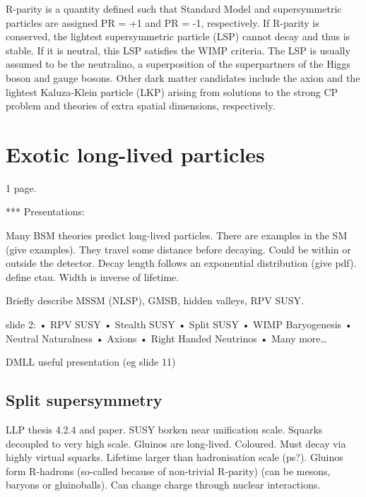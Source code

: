 R-parity is a quantity defined such that Standard Model and supersymmetric 
particles are assigned PR = +1 and PR = -1, respectively. If R-parity is 
conserved, the lightest supersymmetric particle (LSP) cannot decay and thus is 
stable. If it is neutral, this LSP satisfies the WIMP criteria. The LSP is 
usually assumed to be the neutralino, a superposition of the superpartners of 
the Higgs boson and gauge bosons. Other dark matter candidates include the 
axion and the lightest Kaluza-Klein particle (LKP) arising from solutions to 
the strong CP problem and theories of extra spatial dimensions, respectively.

\section{Exotic long-lived particles}
\begin{comment}
More details on LL theories (see LLP thesis, rob slides, my IC/SUSY slides 
etc.), R-hadron, displaced-X searches, GMSB? Note that LLPs exist in SM – call 
them BSMLLPs or LL DM/SUSY signatures? – no, exotic LLPs!
\end{comment}
1 page.

*** Presentations: 


Many BSM theories predict long-lived particles. There are examples in the SM 
(give examples). They travel some distance before decaying. Could be within or 
outside the detector. Decay length follows an exponential distribution (give 
pdf). define ctau. Width is inverse of lifetime.

Briefly describe MSSM (NLSP), GMSB, hidden valleys, RPV SUSY.

slide 2: 
• RPV SUSY
• Stealth SUSY
• Split SUSY
• WIMP Baryogenesis
• Neutral Naturalness
• Axions
• Right Handed Neutrinos
• Many more…


DMLL useful presentation (eg slide 11)


\subsection{Split supersymmetry}
LLP thesis 4.2.4 and paper.
SUSY borken near unification scale. Squarks decoupled to very 
high scale. Gluinos are long-lived. Coloured. Must 
decay via highly virtual squarks. Lifetime larger than hadronisation scale 
(ps?). Gluinos form R-hadrons (so-called because of non-trivial R-parity) (can 
be mesons, baryons or gluinoballs). Can change charge through nuclear 
interactions.


